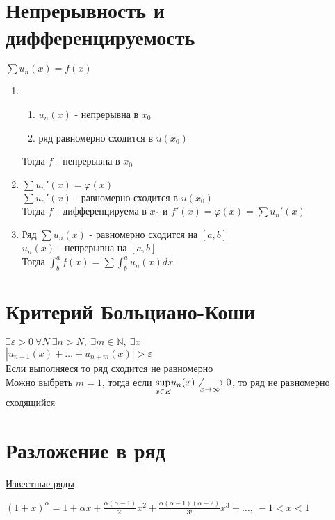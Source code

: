 \documentclass{article}
\begin{document}
\section{Непрерывность и дифференцируемость}
\label{sec:orge48e05a}
\(\sum u_n(x) = f(x)\)
\begin{enumerate}
\item \begin{enumerate}
\item \(u_n(x)\) - непрерывна в \(x_0\)
\item ряд равномерно сходится в \(u(x_0)\)
\end{enumerate}
Тогда \(f\) - непрерывна в \(x_0\)
\item \(\sum u_n'(x) = \varphi(x)\) \\
\(\sum u_n'(x)\) - равномерно сходится в \(u(x_0)\) \\
Тогда \(f\) - дифференцируема в \(x_0\) и \(f'(x) = \varphi(x) = \sum u_n'(x)\)
\item Ряд \(\sum u_n(x)\) - равномерно сходится на \([a, b]\) \\
\(u_n(x)\) - непрерывна на \([a, b]\) \\
Тогда \(\int^a_b f(x) = \sum \int^a_b u_n(x)dx\)
\end{enumerate}
\section{Критерий Больциано-Коши}
\label{sec:org21eb678}
\(\exists \varepsilon > 0\ \forall N\ \exists n > N,\ \exists m \in \mathbb{N},\ \exists x\) \\
\(|u_{n + 1}(x) + \dots + u_{n + m}(x)| > \varepsilon\) \\
Если выполняеся то ряд сходится не равномерно \\
Можно выбрать \(m = 1\), тогда если \(\underset{x \in E}{\sup} u_n(x) \not \xrightarrow[x \to \infty]{} 0\), то ряд не равномерно сходящийся
\section{Разложение в ряд}
\label{sec:orgb8813bc}
\href{http://www.math24.ru/\%D1\%80\%D0\%B0\%D0\%B7\%D0\%BB\%D0\%BE\%D0\%B6\%D0\%B5\%D0\%BD\%D0\%B8\%D0\%B5-\%D1\%84\%D1\%83\%D0\%BD\%D0\%BA\%D1\%86\%D0\%B8\%D0\%B9-\%D0\%B2-\%D1\%81\%D1\%82\%D0\%B5\%D0\%BF\%D0\%B5\%D0\%BD\%D0\%BD\%D1\%8B\%D0\%B5-\%D1\%80\%D1\%8F\%D0\%B4\%D1\%8B.html}{Известные ряды} 

\((1 + x)^\alpha = 1 + \alpha x + \frac{\alpha(\alpha - 1)}{2!}x^2 + \frac{\alpha(\alpha - 1)(\alpha - 2)}{3!}x^3 + \dots,\ -1 < x < 1\) 
\end{document}
